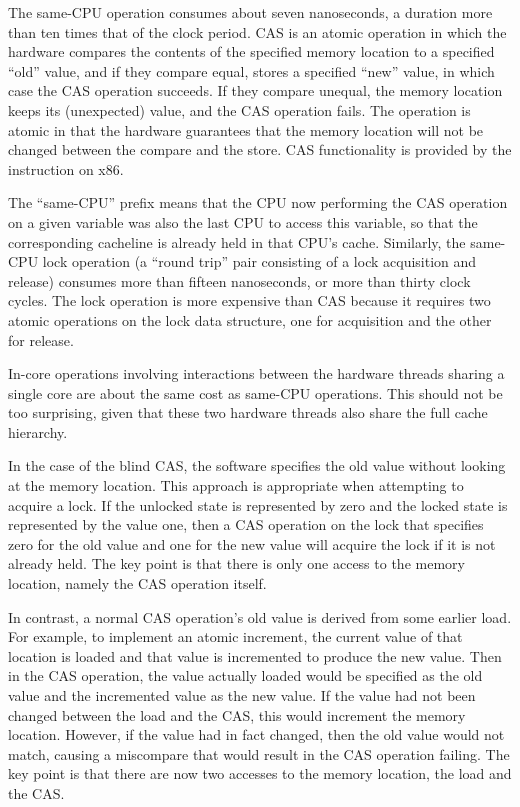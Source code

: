 The same-CPU  operation consumes about seven
nanoseconds, a duration more than ten times that of the clock period.
CAS is an atomic operation in which the hardware compares the contents
of the specified memory location to a specified ``old'' value, and if
they compare equal, stores a specified ``new'' value, in which case the
CAS operation succeeds.
If they compare unequal, the memory location keeps its (unexpected) value,
and the CAS operation fails.
The operation is atomic in that the hardware guarantees that the memory
location will not be changed between the compare and the store.
CAS functionality is provided by the  instruction on x86.

The ``same-CPU'' prefix means that the CPU now performing the CAS operation
on a given variable was also the last CPU to access this variable, so
that the corresponding cacheline is already held in that CPU's cache.
Similarly, the same-CPU lock operation (a ``round trip'' pair consisting
of a lock acquisition and release) consumes more than fifteen nanoseconds,
or more than thirty clock cycles.
The lock operation is more expensive than CAS because it requires two
atomic operations on the lock data structure, one for acquisition and
the other for release.

In-core operations involving interactions between the hardware threads
sharing a single core are about the same cost as same-CPU operations.
This should not be too surprising, given that these two hardware threads
also share the full cache hierarchy.

In the case of the blind CAS, the software specifies the old value
without looking at the memory location.
This approach is appropriate when attempting to acquire a lock.
If the unlocked state is represented by zero and the locked state
is represented by the value one, then a CAS operation on the lock
that specifies zero for the old value and one for the new value
will acquire the lock if it is not already held.
The key point is that there is only one access to the memory
location, namely the CAS operation itself.

In contrast, a normal CAS operation's old value is derived from
some earlier load.
For example, to implement an atomic increment, the current value of
that location is loaded and that value is incremented to produce the
new value.
Then in the CAS operation, the value actually loaded would be specified
as the old value and the incremented value as the new value.
If the value had not been changed between the load and the CAS, this
would increment the memory location.
However, if the value had in fact changed, then the old value would
not match, causing a miscompare that would result in the CAS operation
failing.
The key point is that there are now two accesses to the memory location,
the load and the CAS\@.

